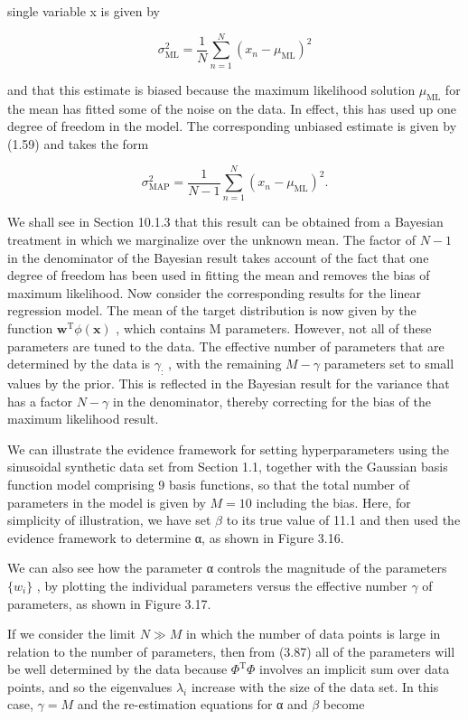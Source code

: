 \documentclass[
  10
]{article}
\begin{document}
single variable x is given by

\[
\sigma_ {\mathrm{ML}} ^ {2} = \frac {1}{N} \sum_ {n = 1} ^ {N} (x _ {n} - \mu_ {\mathrm{ML}}) ^ {2}\tag{3.96}
\]

and that this estimate is biased because the maximum likelihood solution
\(\mu _ { \mathrm { M L } }\) for the mean has fitted some of the noise
on the data. In effect, this has used up one degree of freedom in the
model. The corresponding unbiased estimate is given by (1.59) and takes
the form

\[
\sigma_ {\mathrm{MAP}} ^ {2} = \frac {1}{N - 1} \sum_ {n = 1} ^ {N} (x _ {n} - \mu_ {\mathrm{ML}}) ^ {2}.\tag{3.97}
\]

We shall see in Section 10.1.3 that this result can be obtained from a
Bayesian treatment in which we marginalize over the unknown mean. The
factor of \(N - 1\) in the denominator of the Bayesian result takes
account of the fact that one degree of freedom has been used in fitting
the mean and removes the bias of maximum likelihood. Now consider the
corresponding results for the linear regression model. The mean of the
target distribution is now given by the function
\(\mathbf { w } ^ { \mathrm { \scriptscriptstyle T } } \phi ( \mathbf { x } )\)
, which contains M parameters. However, not all of these parameters are
tuned to the data. The effective number of parameters that are
determined by the data is \(\gamma _ { \mathrm { : } }\) , with the
remaining \(M - \gamma\) parameters set to small values by the prior.
This is reflected in the Bayesian result for the variance that has a
factor \(N - \gamma\) in the denominator, thereby correcting for the
bias of the maximum likelihood result.

We can illustrate the evidence framework for setting hyperparameters
using the sinusoidal synthetic data set from Section 1.1, together with
the Gaussian basis function model comprising 9 basis functions, so that
the total number of parameters in the model is given by \(M = 1 0\)
including the bias. Here, for simplicity of illustration, we have set
\(\beta\) to its true value of 11.1 and then used the evidence framework
to determine α, as shown in Figure 3.16.

We can also see how the parameter α controls the magnitude of the
parameters \(\{ w _ { i } \}\) , by plotting the individual parameters
versus the effective number \(\gamma\) of parameters, as shown in Figure
3.17.

If we consider the limit \(N \gg M\) in which the number of data points
is large in relation to the number of parameters, then from (3.87) all
of the parameters will be well determined by the data because
\(\Phi ^ { \mathrm { T } } \Phi\) involves an implicit sum over data
points, and so the eigenvalues \(\lambda _ { i }\) increase with the
size of the data set. In this case, \(\gamma = M\) and the re-estimation
equations for α and \(\beta\) become
\end{document}

